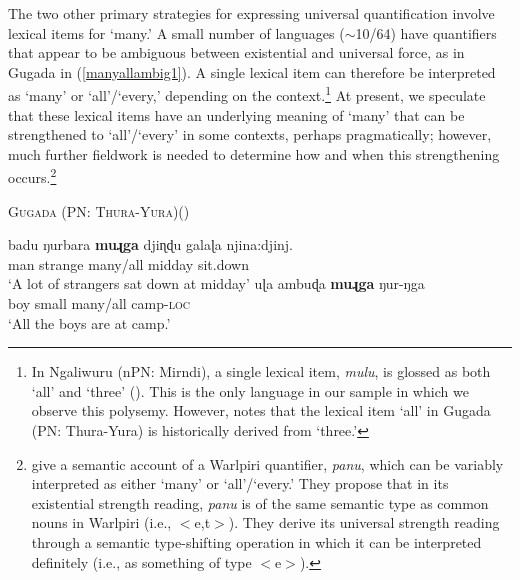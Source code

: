 \documentclass[12pt,egregdoesnotlikesansseriftitles]{scrartcl}
\begin{document}
The two other primary strategies for expressing universal quantification  involve lexical items for `many.' A small number of languages ($\sim$10/64) have quantifiers that appear to be ambiguous between existential and universal force, as in Gugada \textit{} in  (\ref{manyallambig1}). A single lexical item can therefore be interpreted as `many' or `all'/`every,' depending on the context.\footnote{In Ngaliwuru (nPN: Mirndi), a single lexical item, \textit{mulu}, is glossed as both `all' and `three' (\citealt[77]{boltetal71}). This is the only language in our sample in which we observe this polysemy. However, \cite{platt72} notes that the lexical item \textit{{}} `all' in Gugada (PN: Thura-Yura) is historically derived from `three.'} At present, we speculate that these lexical items have an underlying meaning of `many' that can be strengthened to `all'/`every' in some contexts, perhaps pragmatically; however, much further fieldwork is needed to determine how and when this strengthening occurs.\footnote{\cite{bittnerhale95} give a semantic account of a Warlpiri quantifier, {\it panu}, which can be variably interpreted as either `many' or `all'/`every.' They propose that in its existential strength reading, {\it panu} is of the same semantic type as common nouns in Warlpiri (i.e., $<$e,t$>$). They derive its universal strength reading through a semantic type-shifting operation in which it can be interpreted definitely (i.e., as something of type $<$e$>$).} %

\begin{exe}
  \ex  \textsc{Gugada (PN: Thura-Yura)}\hfill (\citealt[56-65]{platt72}) \label{manyallambig1}
  \begin{xlist}
    \ex \gll badu ŋurbara \textbf{muɻga} {djiɳɖu galaɭa} njina:djinj. \\ 
    man  strange  many/all  midday         sit.down\\
    \glt `A lot of strangers sat down at midday'
    \ex \gll uɭa ambuɖa \textbf{muɻga} ŋur-ŋga  \\
    boy   small    many/all      camp-\textsc{loc}\\
    \glt        `All the boys are at camp.'%
  \end{xlist}
 \end{exe}
 
\end{document}
